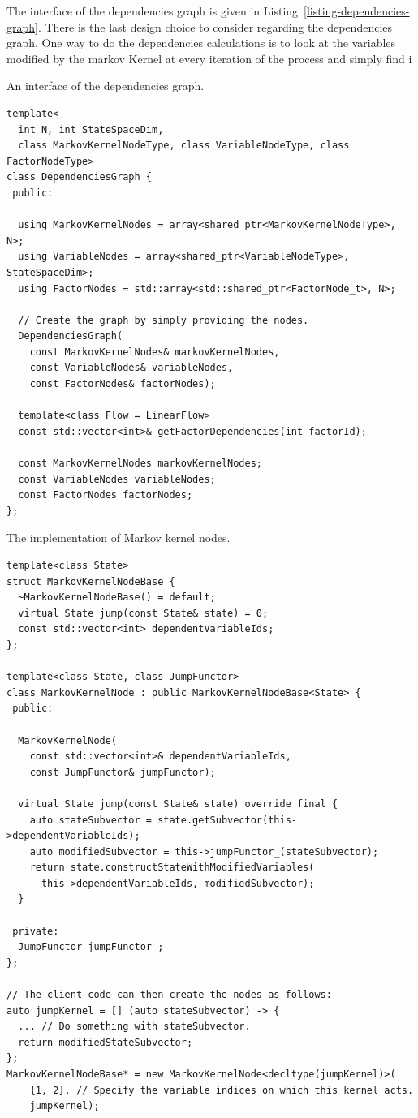 \documentclass[report.tex]{subfiles}
\begin{document}
The interface of the dependencies graph is given in Listing~\ref{listing-dependencies-graph}.
There is the last design choice to consider regarding the dependencies graph.
One way to do the dependencies calculations is to look at the variables
modified by the markov Kernel at every iteration of the process and simply
find i


\begin{lstfloat}
\caption{An interface of the dependencies graph.}
\label{listing-dependencies-graph}
\begin{lstlisting}
template<
  int N, int StateSpaceDim,
  class MarkovKernelNodeType, class VariableNodeType, class FactorNodeType>
class DependenciesGraph {
 public:

  using MarkovKernelNodes = array<shared_ptr<MarkovKernelNodeType>, N>;
  using VariableNodes = array<shared_ptr<VariableNodeType>, StateSpaceDim>;
  using FactorNodes = std::array<std::shared_ptr<FactorNode_t>, N>;

  // Create the graph by simply providing the nodes.
  DependenciesGraph(
    const MarkovKernelNodes& markovKernelNodes,
    const VariableNodes& variableNodes,
    const FactorNodes& factorNodes);

  template<class Flow = LinearFlow>
  const std::vector<int>& getFactorDependencies(int factorId);

  const MarkovKernelNodes markovKernelNodes;
  const VariableNodes variableNodes;
  const FactorNodes factorNodes;
};
\end{lstlisting}
\end{lstfloat}


\begin{lstfloat}
\caption{The implementation of Markov kernel nodes.}
\label{markov-kernel-nodes-implementation}
\begin{lstlisting}
template<class State>
struct MarkovKernelNodeBase {
  ~MarkovKernelNodeBase() = default;
  virtual State jump(const State& state) = 0;
  const std::vector<int> dependentVariableIds;
};

template<class State, class JumpFunctor>
class MarkovKernelNode : public MarkovKernelNodeBase<State> {
 public:

  MarkovKernelNode(
    const std::vector<int>& dependentVariableIds,
    const JumpFunctor& jumpFunctor);

  virtual State jump(const State& state) override final {
    auto stateSubvector = state.getSubvector(this->dependentVariableIds);
    auto modifiedSubvector = this->jumpFunctor_(stateSubvector);
    return state.constructStateWithModifiedVariables(
      this->dependentVariableIds, modifiedSubvector);
  }

 private:
  JumpFunctor jumpFunctor_;
};

// The client code can then create the nodes as follows:
auto jumpKernel = [] (auto stateSubvector) -> {
  ... // Do something with stateSubvector.
  return modifiedStateSubvector;
};
MarkovKernelNodeBase* = new MarkovKernelNode<decltype(jumpKernel)>(
    {1, 2}, // Specify the variable indices on which this kernel acts.
    jumpKernel);

\end{lstlisting}
\end{lstfloat}
\end{document}
